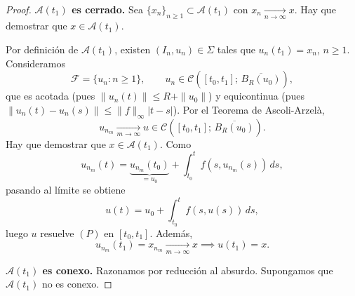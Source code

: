 {\begin{center}
    \end{center}
}

\begin{proof}
    \textbf{$\mathcal{A}(t_1)$ es cerrado.} Sea $\{x_n\}_{n \geq 1} \subset \mathcal{A}(t_1)$ con $x_n \xrightarrow[n \to \infty]{} x$. Hay que demostrar que $x \in \mathcal{A}(t_1)$.

    Por definición de $\mathcal{A}(t_1)$, existen $(I_n, u_n) \in \Sigma$ tales que $u_n(t_1) = x_n$, $n \geq 1$. Consideramos
    \[
        \mathcal{F} = \{ u_n : n \geq 1 \}, \qquad u_n \in \mathcal{C}([t_0, t_1]; \, \overline{B_R(u_0)}),
    \]
    que es acotada (pues $\|u_n(t)\| \leq R + \|u_0\|$) y equicontinua (pues $\|u_n(t) - u_n(s)\| \leq \|f\|_\infty |t - s|$). Por el Teorema de Ascoli-Arzelà,
    \[
        u_{n_m} \xrightarrow[m \to \infty]{} u \in \mathcal{C}([t_0, t_1]; \, \overline{B_R(u_0)}).
    \]
    Hay que demostrar que $x \in \mathcal{A}(t_1)$. Como
    \[
        u_{n_m}(t) = \underbrace{u_{n_m}(t_0)}_{= u_0} + \int_{t_0}^t f(s, u_{n_m}(s)) \, ds,
    \]
    pasando al límite se obtiene
    \[
        u(t) = u_0 + \int_{t_0}^t f(s, u(s)) \, ds,
    \]
    luego $u$ resuelve $(P)$ en $[t_0, t_1]$. Además,
    \[
        u_{n_m}(t_1) = x_{n_m} \xrightarrow[m \to \infty]{} x \implies u(t_1) = x.
    \]

    \medskip

    \textbf{$\mathcal{A}(t_1)$ es conexo.} Razonamos por reducción al absurdo. Supongamos que $\mathcal{A}(t_1)$ no es conexo.
    

\end{proof}
